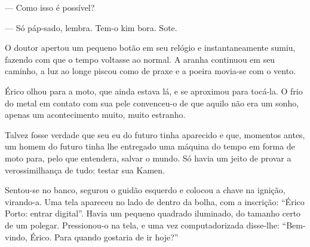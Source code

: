 --- Como isso é possível?

--- Só páp-sado, lembra. Tem-o kim bora. Sote.

O doutor apertou um pequeno botão em seu relógio e instantaneamente
sumiu, fazendo com que o tempo voltasse ao normal. A aranha continuou em
seu caminho, a luz ao longe piscou como de praxe e a poeira movia-se com
o vento.

Érico olhou para a moto, que ainda estava lá, e se aproximou para
tocá-la. O frio do metal em contato com sua pele convenceu-o de que
aquilo não era um sonho, apenas um acontecimento muito, muito estranho.

Talvez fosse verdade que seu eu do futuro tinha aparecido e que,
momentos antes, um homem do futuro tinha lhe entregado uma máquina do
tempo em forma de moto para, pelo que entendera, salvar o mundo. Só
havia um jeito de provar a verossimilhança de tudo: testar sua Kamen.

Sentou-se no banco, segurou o guidão esquerdo e colocou a chave na
ignição, virando-a. Uma tela apareceu no lado de dentro da bolha, com a
inscrição: “Érico Porto: entrar digital”. Havia um pequeno quadrado
iluminado, do tamanho certo de um polegar. Pressionou-o na tela, e uma
vez computadorizada disse-lhe: “Bem-vindo, Érico. Para quando gostaria
de ir hoje?”
